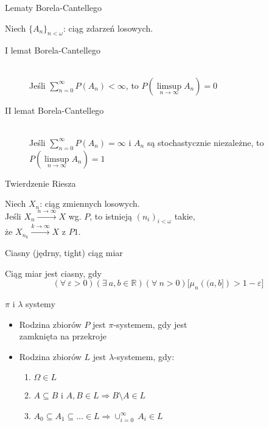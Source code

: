 \documentclass[avery5371,grid,frame]{flashcards}
\begin{document}


\begin{flashcard}[Twierdzenie]{Lematy Borela-Cantellego}

\smallskip
Niech $\{A_n\}_{n < \omega}$: ciąg zdarzeń losowych.
\begin{description}
\item[I lemat Borela-Cantellego] \hfill \\
	Jeśli $\sum_{n=0}^{\infty} P(A_n) < \infty$, to $P\left(\limsup\limits_{n \rightarrow \infty}{A_n}\right)=0$
\item[II lemat Borela-Cantellego] \hfill \\
	Jeśli $\sum_{n=0}^{\infty} P(A_n) = \infty$ i $A_n$ są stochastycznie niezależne, to $P\left(\limsup\limits_{n \rightarrow \infty}{A_n}\right)=1$ 
\end{description}
\end{flashcard}

\begin{flashcard}[Twierdzenie]{Twierdzenie Riesza}

\smallskip
Niech $X_n$: ciąg zmiennych losowych. \medskip \\ 
Jeśli $X_n \xrightarrow{n \rightarrow \infty} X$ wg. $P$, to istnieją $(n_i)_{i < \omega}$ takie, \\
że $X_{n_k} \xrightarrow{k \rightarrow \infty} X$ z $P1$.
\end{flashcard}

\begin{flashcard}[Definicja]{Ciasny (jędrny, tight) ciąg miar}

\smallskip
Ciąg miar jest ciasny, gdy
$$ (\forall \ \varepsilon > 0)(\exists \ a, b \in \mathbb{R})(\forall \ n > 0) \Big[\mu_n \left( (a,b] \right) > 1-\varepsilon \Big] $$
\end{flashcard}

\begin{flashcard}[Definicja]{$\pi$ i $\lambda$ systemy}

\smallskip
\begin{itemize}
\item Rodzina zbiorów $\mathit{P}$ jest $\pi$-systemem, gdy jest \\
zamknięta na przekroje
\item Rodzina zbiorów $\mathit{L}$ jest $\lambda$-systemem, gdy:
	\begin{enumerate}
	\item $\Omega \in \mathit{L}$
	\item $A \subseteq B$ i $A, B \in \mathit{L} \Rightarrow B \setminus A \in \mathit{L}$
	\item $A_0 \subseteq A_1 \subseteq \ldots \in \mathit{L} \Rightarrow \cup^{\infty}_{i=0} \ A_i \in \mathit{L}$
	\end{enumerate}

\end{itemize}
\end{flashcard}
\end{document}
